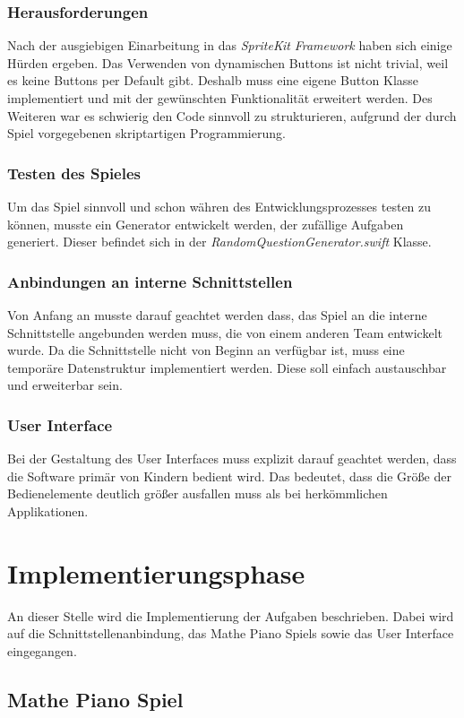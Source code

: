 \subsubsection{Herausforderungen}
Nach der ausgiebigen Einarbeitung in das \textit{SpriteKit} \textit{Framework} haben sich einige Hürden ergeben. Das Verwenden von dynamischen Buttons ist nicht trivial, weil es keine Buttons per Default gibt. Deshalb muss eine eigene Button Klasse implementiert und mit der gewünschten Funktionalität erweitert werden. Des Weiteren war es schwierig den Code sinnvoll zu strukturieren, aufgrund der durch Spiel vorgegebenen skriptartigen Programmierung. 
\subsubsection{Testen des Spieles}
Um das Spiel sinnvoll und schon währen des Entwicklungsprozesses testen zu können, musste ein Generator entwickelt werden, der zufällige Aufgaben generiert. Dieser befindet sich in der \textit{RandomQuestionGenerator.swift} Klasse. 
\subsubsection{Anbindungen an interne Schnittstellen}
Von Anfang an musste darauf geachtet werden dass, das Spiel an die interne Schnittstelle angebunden werden muss, die von einem anderen Team entwickelt wurde. Da die Schnittstelle nicht von Beginn an verfügbar ist, muss eine temporäre Datenstruktur implementiert werden. Diese soll einfach austauschbar und erweiterbar sein.
\subsubsection{User Interface}
Bei der Gestaltung des User Interfaces muss explizit darauf geachtet werden, dass die Software primär von Kindern bedient wird. Das bedeutet, dass die Größe der Bedienelemente deutlich größer ausfallen muss als bei herkömmlichen Applikationen.   

\section{Implementierungsphase}
An dieser Stelle wird die Implementierung der Aufgaben beschrieben. Dabei wird auf die Schnittstellenanbindung, das Mathe Piano Spiels sowie das User Interface eingegangen.
\subsection{Mathe Piano Spiel}
